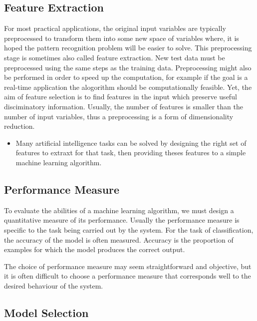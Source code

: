 \documentclass{scrartcl}
\begin{document}
\subsection{Feature Extraction}

For most practical applications, the original input variables are typically preprocessed to transform them into some new space of variables where, it is hoped the pattern recognition problem will be easier to solve. This preprocessing stage is sometimes also called feature extraction. New test data must be preprocessed using the same steps as the training data. Preprocessing might also be performed in order to speed up the computation, for example if the goal is a real-time application the alogorithm should be computationally feasible. Yet, the aim of feature selection is to find features in the input which preserve useful disciminatory information. Usually, the number of features is smaller than the number of input variables, thus a preprocessing is a form of dimensionality reduction. 


\begin{itemize}
\item Many artificial intelligence tasks can be solved by designing the right set of features to extraxt for that task, then providing theses features to a simple machine learning algorithm. \cite{Goodfellow2016}
\end{itemize}


\subsection{Performance Measure}

To evaluate the abilities of a machine learning algorithm, we must design a quantitative measure of its performance. Usually the performance measure is specific to the task being carried out by the system. For the task of classification, the accuracy of the model is often measured. Accuracy is the proportion of examples for which the model produces the correct output. 

The choice of performance measure may seem straightforward and objective, but it is often difficult to choose a performance measure that corresponds well to the desired behaviour of the system. 


\subsection{Model Selection}
\end{document}
